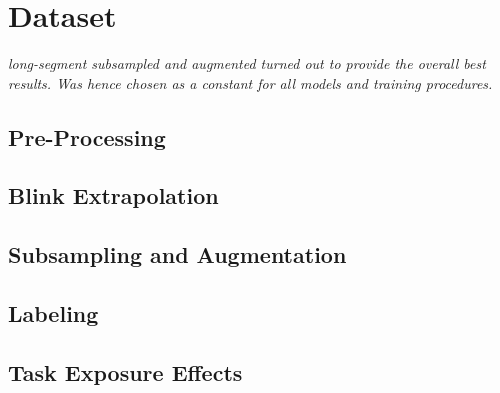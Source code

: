 \section{Dataset} \label{sec:impl/dataset}

\textit{long-segment subsampled and augmented turned out to provide the overall best results. Was hence chosen as a constant for all models and training procedures.}

\subsection{Pre-Processing}

\subsection{Blink Extrapolation}

\subsection{Subsampling and Augmentation}

\subsection{Labeling}

\subsection{Task Exposure Effects}


